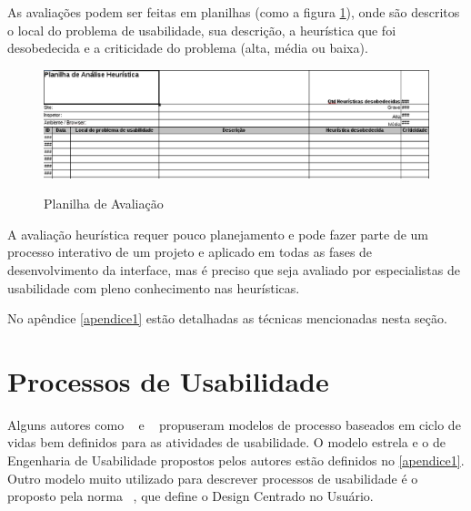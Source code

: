 \begin{description}
	As avaliações podem ser feitas em planilhas (como a figura \ref{planilha}), onde são descritos o local do problema de usabilidade, sua descrição, a heurística que foi desobedecida e a criticidade do problema (alta, média ou baixa).

	\begin{figure}[h]
    	\centering
    	\includegraphics[keepaspectratio=true,scale=0.48]
      	{figuras/planilha.eps}
      	\label{planilha}
    	\caption{Planilha de Avaliação}
	\end{figure}

	A avaliação heurística requer pouco planejamento e pode fazer parte de um processo interativo de um projeto e aplicado em todas as fases de desenvolvimento da interface, mas é preciso que seja avaliado por especialistas de usabilidade com pleno conhecimento nas heurísticas.
\end{description}

%
No apêndice \ref{apendice1} estão detalhadas as técnicas mencionadas nesta seção.



\section{Processos de Usabilidade}


	Alguns autores como ~ e ~ propuseram modelos de processo baseados em ciclo de vidas bem definidos para as atividades de usabilidade. O modelo estrela e o de Engenharia de Usabilidade propostos pelos autores estão definidos no \ref{apendice1}. 
	Outro modelo muito utilizado para descrever processos de usabilidade é o proposto pela norma ~, que define o Design Centrado no Usuário.


